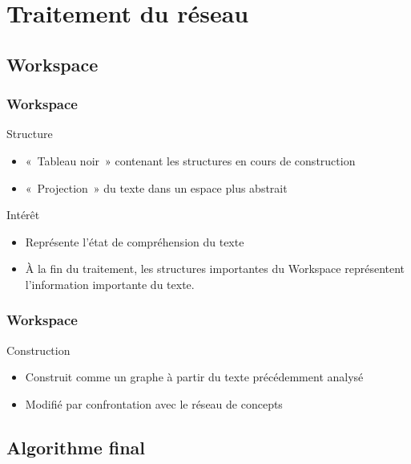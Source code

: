 \documentclass[12pt, handout]{beamer}
\begin{document}
\section{Traitement du réseau}

\subsection{Workspace}

\begin{frame}
  \frametitle{Workspace}

  \begin{block}{Structure}
    \begin{itemize}
      \item «~Tableau noir~» contenant les structures en cours de construction
      \item «~Projection~» du texte dans un espace plus abstrait
    \end{itemize}
  \end{block}
  \begin{block}{Intérêt}
    \begin{itemize}
      \item Représente l'état de compréhension du texte
      \item À la fin du traitement, les structures importantes du Workspace représentent l'information importante du texte.
    \end{itemize}
  \end{block}

\end{frame}

\begin{frame}
  \frametitle{Workspace}
 
  \begin{block}{Construction}
    \begin{itemize}
      \item Construit comme un graphe à partir du texte précédemment analysé
      \item Modifié par confrontation avec le réseau de concepts
    \end{itemize}
  \end{block}
 
\end{frame}

\subsection{Algorithme final}
\end{document}
